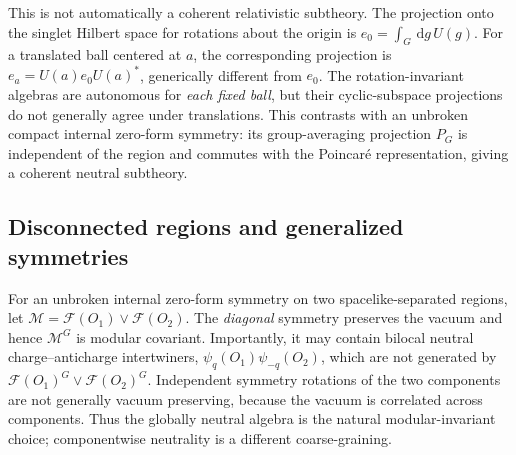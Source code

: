 \documentclass[a4paper,11pt]{article}
\theoremstyle{definition}
\newcommand{\dd}{\,\mathrm{d}}
\begin{document}
This is not automatically a coherent relativistic subtheory. The
projection onto the singlet Hilbert space for rotations about the
origin is $e_0=\int_G\dd g\,U(g)$. For a translated ball centered at
$a$, the corresponding projection is
$e_a=U(a)e_0U(a)^*$, generically different from $e_0$.
The rotation-invariant algebras are autonomous for \emph{each fixed
ball}, but their cyclic-subspace projections do not generally agree
under translations. This contrasts with an unbroken compact internal
zero-form symmetry: its group-averaging projection $P_G$ is independent
of the region and commutes with the Poincar\'e representation, giving
a coherent neutral subtheory.

\subsection{Disconnected regions and generalized symmetries}
\label{subsec:qft-generalized-symmetries}
For an unbroken internal zero-form symmetry on two spacelike-separated
regions, let
$\mathcal M=\mathcal F(O_1)\vee\mathcal F(O_2)$.
The \emph{diagonal} symmetry preserves the vacuum and hence
$\mathcal M^G$ is modular covariant. Importantly, it may contain
bilocal neutral charge--anticharge intertwiners,
$\psi_q(O_1)\psi_{-q}(O_2)$, which are not generated by
$\mathcal F(O_1)^G\vee\mathcal F(O_2)^G$.
Independent symmetry rotations of the two components are not generally
vacuum preserving, because the vacuum is correlated across components.
Thus the globally neutral algebra is the natural modular-invariant
choice; componentwise neutrality is a different coarse-graining.
\end{document}
